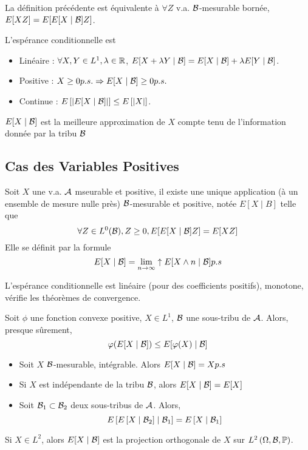 \documentclass{cours}
\begin{document}
\begin{lemma}
    La définition précédente est équivalente à $\forall Z$ v.a. $\mathcal{B}$-mesurable bornée, $E[XZ] = E[E[X\mid \mathcal{B}]Z]$.
\end{lemma}

\begin{proposition}
    L'espérance conditionnelle est
    \begin{itemize}
        \item Linéaire : $\forall X, Y \in L^{1}, \lambda \in \mathbb{R}$, $E[X + \lambda Y \mid \mathcal{B}] = E[X \mid \mathcal{B}] + \lambda E[Y \mid \mathcal{B}]$.
        \item Positive : $X \geq 0 p.s. \Rightarrow E[X \mid \mathcal{B}] \geq 0 p.s.$
        \item Continue : $E\left[\left|E[X \mid \mathcal{B}]\right|\right] \leq E\left[\left|X\right|\right]$.
    \end{itemize}
\end{proposition}

\begin{remark}
    $E[X\mid \mathcal{B}]$ est la meilleure approximation de $X$ compte tenu de l'information donnée par la tribu $\mathcal{B}$
\end{remark}

\subsection{Cas des Variables Positives}
\begin{theorem}
    Soit $X$ une v.a. $\mathcal{A}$ mseurable et positive, il existe une unique application (à un ensemble de mesure nulle près) $\mathcal{B}$-mesurable et positive, notée $E[X \mid B]$ telle que
    \[
        \forall Z \in L^{0}(\mathcal{B}), Z \geq 0, E[E[X \mid \mathcal{B}]Z] = E[XZ]
    \]
    Elle se définit par la formule
    \[
        E[X\mid \mathcal{B}] = \lim_{n \to \infty}\uparrow E[X \wedge n \mid \mathcal{B}] p.s
    \]
\end{theorem}

\begin{proposition}
    L'espérance conditionnelle est linéaire (pour des coefficients positifs), monotone, vérifie les théorèmes de convergence.
\end{proposition}
\begin{lemma}
    Soit $\phi$ une fonction convexe positive, $X \in L^{1}$, $\mathcal{B}$ une sous-tribu de $\mathcal{A}$. Alors, presque sûrement, \[\varphi(E[X\mid \mathcal{B}]) \leq E[\varphi(X) \mid \mathcal{B}]\]
\end{lemma}

\begin{proposition}
    \begin{itemize}
        \item Soit $X$ $\mathcal{B}$-mesurable, intégrable. Alors $E[X \mid \mathcal{B}] = X p.s$
        \item Si $X$ est indépendante de la tribu $\mathcal{B}$, alors $E[X \mid \mathcal{B}] = E[X]$
        \item Soit $\mathcal{B}_{1} \subset \mathcal{B}_{2}$ deux sous-tribus de $\mathcal{A}$. Alors,
              \[
                  E\left[E\left[X \mid \mathcal{B}_{2}\right] \mid \mathcal{B}_{1}\right] = E\left[X \mid \mathcal{B}_{1}\right]
              \]
    \end{itemize}
\end{proposition}

\begin{theorem}
    Si $X \in L^{2}$, alors $E[X \mid \mathcal{B}]$ est la projection orthogonale de $X$ sur $L^{2}\left(\Omega, \mathcal{B}, \mathbb{P}\right)$.
\end{theorem}
\end{document}
